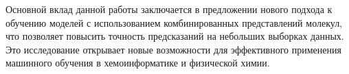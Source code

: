 Основной вклад данной работы заключается в предложении нового подхода к обучению моделей с использованием комбинированных представлений молекул, что позволяет повысить точность предсказаний на небольших выборках данных. Это исследование открывает новые возможности для эффективного применения машинного обучения в хемоинформатике и физической химии.





\newpage
